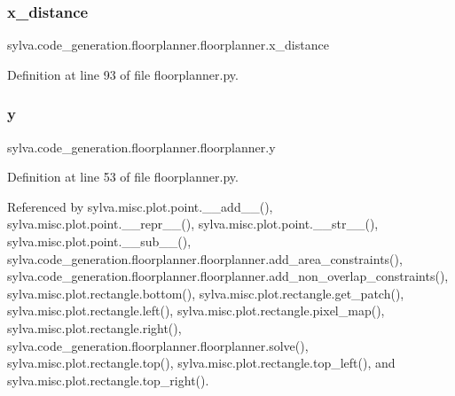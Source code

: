 \subsubsection{\texorpdfstring{x\+\_\+distance}{x\_distance}}
{\footnotesize\ttfamily sylva.\+code\+\_\+generation.\+floorplanner.\+floorplanner.\+x\+\_\+distance}



Definition at line 93 of file floorplanner.\+py.

\mbox{\label{classsylva_1_1code__generation_1_1floorplanner_1_1floorplanner_a583eb5cc30fb2978384746da5b4b440f}} 
\subsubsection{\texorpdfstring{y}{y}}
{\footnotesize\ttfamily sylva.\+code\+\_\+generation.\+floorplanner.\+floorplanner.\+y}



Definition at line 53 of file floorplanner.\+py.



Referenced by sylva.\+misc.\+plot.\+point.\+\_\+\+\_\+add\+\_\+\+\_\+(), sylva.\+misc.\+plot.\+point.\+\_\+\+\_\+repr\+\_\+\+\_\+(), sylva.\+misc.\+plot.\+point.\+\_\+\+\_\+str\+\_\+\+\_\+(), sylva.\+misc.\+plot.\+point.\+\_\+\+\_\+sub\+\_\+\+\_\+(), sylva.\+code\+\_\+generation.\+floorplanner.\+floorplanner.\+add\+\_\+area\+\_\+constraints(), sylva.\+code\+\_\+generation.\+floorplanner.\+floorplanner.\+add\+\_\+non\+\_\+overlap\+\_\+constraints(), sylva.\+misc.\+plot.\+rectangle.\+bottom(), sylva.\+misc.\+plot.\+rectangle.\+get\+\_\+patch(), sylva.\+misc.\+plot.\+rectangle.\+left(), sylva.\+misc.\+plot.\+rectangle.\+pixel\+\_\+map(), sylva.\+misc.\+plot.\+rectangle.\+right(), sylva.\+code\+\_\+generation.\+floorplanner.\+floorplanner.\+solve(), sylva.\+misc.\+plot.\+rectangle.\+top(), sylva.\+misc.\+plot.\+rectangle.\+top\+\_\+left(), and sylva.\+misc.\+plot.\+rectangle.\+top\+\_\+right().

\mbox{\label{classsylva_1_1code__generation_1_1floorplanner_1_1floorplanner_abf433d1b5543d12d04aba987eac72755}} 
